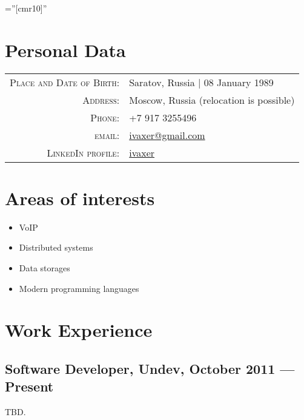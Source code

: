 \documentclass[a4paper,10pt]{article}
\begin{document}
\pagestyle{empty}

\font\fb=''[cmr10]''

\par{\bigskip\par}


\section{Personal Data}

\begin{tabular}{rl}
    \textsc{Place and Date of Birth:} & Saratov, Russia  | 08 January 1989 \\
    \textsc{Address:}   & Moscow, Russia (relocation is possible) \\
    \textsc{Phone:}     & +7 917 3255496\\
    \textsc{email:}     & \href{mailto:ivaxer@gmail.com}{ivaxer@gmail.com} \\
    \textsc{LinkedIn profile:} & \href{http://www.linkedin.com/in/ivaxer}{ivaxer}
\end{tabular}


\section{Areas of interests}
\begin{itemize}
\item VoIP
\item Distributed systems
\item Data storages
\item Modern programming languages
\end{itemize}


\section{Work Experience}
\subsection{Software Developer, Undev, October 2011 --- Present}
TBD.
\end{document}
